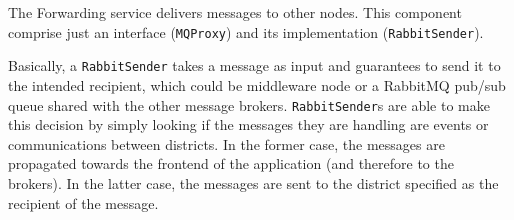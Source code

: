 The Forwarding service delivers messages to other nodes. This component
comprise just an interface (\texttt{MQProxy}) and its
implementation (\texttt{RabbitSender}).

Basically, a \texttt{RabbitSender} takes a message as input and guarantees to
send it to the intended recipient, which could be middleware node or a
RabbitMQ pub/sub queue shared with the other message brokers.
\texttt{RabbitSender}s are able to make this decision by simply looking if the
messages they are handling are events or communications between districts.
In the former case, the messages are propagated towards the frontend of the
application (and therefore to the brokers). In the latter case, the messages are
sent to the district specified as the recipient of the message.
